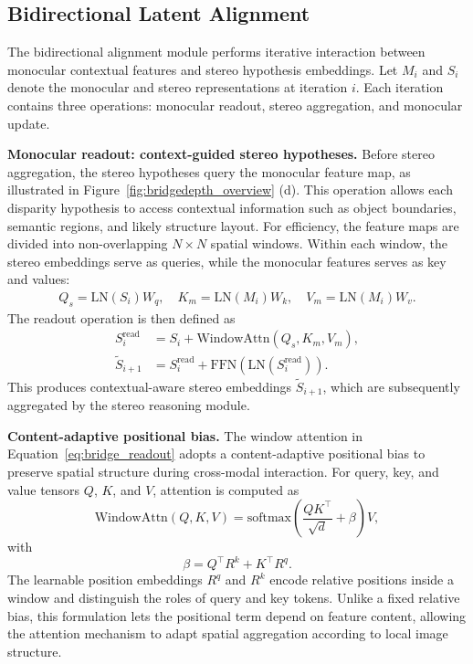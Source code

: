 \subsection{Bidirectional Latent Alignment}
The bidirectional alignment module performs iterative interaction between monocular contextual features and stereo hypothesis embeddings.
Let $M_i$ and $S_i$ denote the monocular and stereo representations at iteration $i$.
Each iteration contains three operations: monocular readout, stereo aggregation, and monocular update.

\noindent\textbf{Monocular readout: context-guided stereo hypotheses.}
Before stereo aggregation, the stereo hypotheses query the monocular feature map, as illustrated in Figure~\ref{fig:bridgedepth_overview} (d).
This operation allows each disparity hypothesis to access contextual information such as object boundaries, semantic regions, and likely structure layout.
For efficiency, the feature maps are divided into non-overlapping $N\times N$ spatial windows.
Within each window, the stereo embeddings serve as queries, while the monocular features serves as key and values:
\begin{equation} \begin{aligned} Q_s = \mathrm{LN}(S_i) W_q, \quad K_m = \mathrm{LN}(M_i) W_k, \quad V_m = \mathrm{LN}(M_i) W_v. \end{aligned} \end{equation}
The readout operation is then defined as
\begin{align} 
	S_i^{\mathrm{read}} &= S_i + \mathrm{WindowAttn}(Q_s, K_m, V_m), \\ \widetilde{S}_{i+1} &= S_i^{\mathrm{read}} + \mathrm{FFN}\left(\mathrm{LN}(S_i^{\mathrm{read}})\right). 
	\label{eq:bridge_readout}
\end{align}
This produces contextual-aware stereo embeddings $\widetilde{S}_{i+1}$, which are subsequently aggregated by the stereo reasoning module.

\noindent\textbf{Content-adaptive positional bias.} The window attention in Equation~\ref{eq:bridge_readout} adopts a content-adaptive positional bias to preserve spatial structure during cross-modal interaction.
For query, key, and value tensors $Q$, $K$, and $V$, attention is computed as
\begin{equation} \mathrm{WindowAttn}(Q,K,V) = \mathrm{softmax}\left(\frac{QK^{\top}}{\sqrt{d}} + \beta \right)V, \end{equation}
with
\begin{equation} \beta = Q^{\top}R^k + K^{\top}R^q. \label{eq:bridge_pos_bias} \end{equation}
The learnable position embeddings $R^q$ and $R^k$ encode relative positions inside a window and distinguish the roles of query and key tokens.
Unlike a fixed relative bias, this formulation lets the positional term depend on feature content, allowing the attention mechanism to adapt spatial aggregation according to local image structure.

